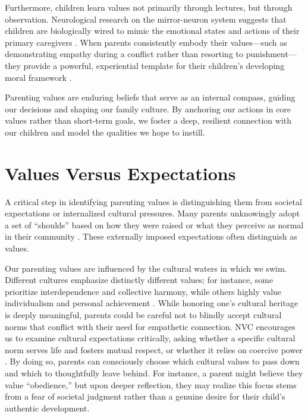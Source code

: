 Furthermore, children learn values not primarily through lectures, but through observation.
Neurological research on the mirror-neuron system suggests that children are biologically wired to mimic the emotional states and actions of their primary caregivers \citep{rizzolatti2004}.
When parents consistently embody their values---such as demonstrating empathy during a conflict rather than resorting to punishment---they provide a powerful, experiential template for their children's developing moral framework \citep{hoffman2000}.

\begin{keyinsight}
Parenting values are enduring beliefs that serve as an internal compass, guiding our decisions and shaping our family culture.
By anchoring our actions in core values rather than short-term goals, we foster a deep, resilient connection with our children and model the qualities we hope to instill.
\end{keyinsight}

\section{Values Versus Expectations}

A critical step in identifying parenting values is distinguishing them from societal expectations or internalized cultural pressures.
Many parents unknowingly adopt a set of ``shoulds'' based on how they were raised or what they perceive as normal in their community \citep{siegel2003}.
These externally imposed expectations often distinguish as values.

Our parenting values are influenced by the cultural waters in which we swim.
Different cultures emphasize distinctly different values; for instance, some prioritize interdependence and collective harmony, while others highly value individualism and personal achievement \citep{schwartz2012}.
While honoring one's cultural heritage is deeply meaningful, parents could be careful not to blindly accept cultural norms that conflict with their need for empathetic connection.
NVC encourages us to examine cultural expectations critically, asking whether a specific cultural norm serves life and fosters mutual respect, or whether it relies on coercive power \citep{rosenberg2003}.
By doing so, parents can consciously choose which cultural values to pass down and which to thoughtfully leave behind.
For instance, a parent might believe they value ``obedience,'' but upon deeper reflection, they may realize this focus stems from a fear of societal judgment rather than a genuine desire for their child's authentic development.


